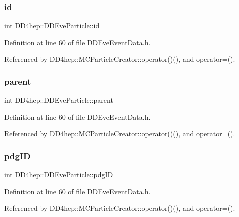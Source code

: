 \subsubsection{\texorpdfstring{id}{id}}
{\footnotesize\ttfamily int D\+D4hep\+::\+D\+D\+Eve\+Particle\+::id}



Definition at line 60 of file D\+D\+Eve\+Event\+Data.\+h.



Referenced by D\+D4hep\+::\+M\+C\+Particle\+Creator\+::operator()(), and operator=().

\hypertarget{class_d_d4hep_1_1_d_d_eve_particle_aa405afce24519cce61999543be3f0d33}{}\label{class_d_d4hep_1_1_d_d_eve_particle_aa405afce24519cce61999543be3f0d33} 
\subsubsection{\texorpdfstring{parent}{parent}}
{\footnotesize\ttfamily int D\+D4hep\+::\+D\+D\+Eve\+Particle\+::parent}



Definition at line 60 of file D\+D\+Eve\+Event\+Data.\+h.



Referenced by D\+D4hep\+::\+M\+C\+Particle\+Creator\+::operator()(), and operator=().

\hypertarget{class_d_d4hep_1_1_d_d_eve_particle_af205b9bbb31c48d31d62a2c5013ff4cd}{}\label{class_d_d4hep_1_1_d_d_eve_particle_af205b9bbb31c48d31d62a2c5013ff4cd} 
\subsubsection{\texorpdfstring{pdg\+ID}{pdgID}}
{\footnotesize\ttfamily int D\+D4hep\+::\+D\+D\+Eve\+Particle\+::pdg\+ID}



Definition at line 60 of file D\+D\+Eve\+Event\+Data.\+h.



Referenced by D\+D4hep\+::\+M\+C\+Particle\+Creator\+::operator()(), and operator=().

\hypertarget{class_d_d4hep_1_1_d_d_eve_particle_afbc3020b2ad0f4df7b3c36929d4cd11e}{}\label{class_d_d4hep_1_1_d_d_eve_particle_afbc3020b2ad0f4df7b3c36929d4cd11e} 
